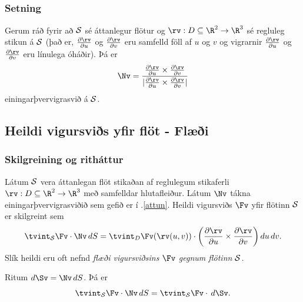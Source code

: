 \subsection{} 

\subsubsection{Setning }
 Gerum ráð fyrir að $\cal S$ sé áttanlegur
flötur og $\rv:D\subseteq\R^2\rightarrow \R^3$ sé regluleg stikun á
$\cal S$ (það er, $\frac{\partial \rv}{\partial u}$ og
$\frac{\partial \rv}{\partial v}$ eru samfelld föll af $u$ og $v$ og 
vigrarnir $\frac{\partial \rv}{\partial u}$ og
$\frac{\partial \rv}{\partial v}$ eru línulega óháðir).
Þá er 
$$\Nv=
\frac{\frac{\partial \rv}{\partial u}\times\frac{\partial
    \rv}{\partial v}}
{|\frac{\partial \rv}{\partial u}\times\frac{\partial
    \rv}{\partial v}|}$$
einingarþvervigrasvið á $\cal S$.  







\subsection{Heildi vigursviðs yfir flöt - Flæði} 

\subsubsection{Skilgreining og ritháttur \rtask{}}
 Látum $\cal S$ vera áttanlegan flöt stikaðan
af reglulegum stikaferli  $\rv:D\subseteq\R^2\rightarrow \R^3$ með
samfelldar hlutafleiður.  Látum $\Nv$ tákna einingarþver\-vigrasviðið
sem gefið er í \kaflanr.\ref{attun}.  Heildi vigursviðs $\Fv$ yfir flötinn $\cal S$ er
skilgreint sem 
$$\tvint_{\cal S} \Fv\cdot\Nv\,dS
=\tvint_D \Fv(\rv(u,v))\cdot \bigg(
\frac{\partial \rv}{\partial u}\times\frac{\partial \rv}{\partial
  v}\bigg)\,
du\,dv.$$
Slík heildi eru oft nefnd \emph{flæði vigursviðsins $\Fv$ gegnum flötinn $\cal S$.}

\bigskip
 Ritum $d\Sv=\Nv\,dS$.  Þá  er 
$$\tvint_{\cal S} \Fv\cdot\Nv\,dS=\tvint_{\cal S} \Fv\cdot\,d\Sv.$$







\subsection{} 

